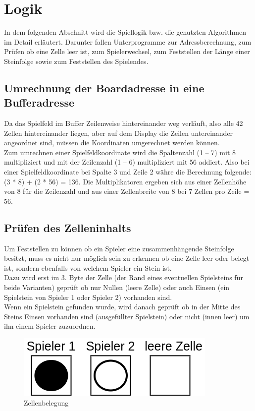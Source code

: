 \newpage
\section{Logik}
    In dem folgenden Abschnitt wird die Spiellogik bzw. die genutzten Algorithmen im Detail erläutert.
    Darunter fallen Unterprogramme zur Adressberechnung, zum Prüfen ob eine Zelle leer ist, zum Spielerwechsel,
    zum Feststellen der Länge einer Steinfolge sowie zum Feststellen des Spielendes.

    \subsection{Umrechnung der Boardadresse in eine Bufferadresse}
        Da das Spielfeld im Buffer Zeilenweise hintereinander weg verläuft, also alle 42 Zellen hintereinander liegen,
        aber auf dem Display die Zeilen untereinander angeordnet sind, müssen die Koordinaten umgerechnet werden können.
        \\
        Zum umrechnen einer Spielfeldkoordinate wird die Spaltenzahl (1 – 7) mit 8 multipliziert und mit der Zeilenzahl (1 – 6) multipliziert mit 56 addiert.
        Also bei einer Spielfeldkoordinate bei Spalte 3 und Zeile 2 währe die Berechnung folgende: (3 * 8) + (2 * 56) = 136.
        Die Multiplikatoren ergeben sich aus einer Zellenhöhe von 8 für die Zeilenzahl und aus einer Zellenbreite von 8 bei 7 Zellen pro Zeile = 56.

    \subsection{Prüfen des Zelleninhalts}
        Um Feststellen zu können ob ein Spieler eine zusammenhängende Steinfolge besitzt,
        muss es nicht nur möglich sein zu erkennen ob eine Zelle leer oder belegt ist,
        sondern ebenfalls von welchem Spieler ein Stein ist.
        \\
        Dazu wird erst im 3. Byte der Zelle (der Rand eines eventuellen Spielsteins für beide Varianten)
        geprüft ob nur Nullen (leere Zelle) oder auch Einsen (ein Spielstein von Spieler 1 oder Spieler 2) vorhanden sind.
        \\
        Wenn ein Spielstein gefunden wurde,
        wird danach geprüft ob in der Mitte des Steins Einsen vorhanden sind (ausgefüllter Spielstein) oder nicht (innen leer)
        um ihn einem Spieler zuzuordnen.

        \begin{figure}[H]
            \centering
            \includegraphics[scale=0.5]{img/steine.png}    
            \caption{Zellenbelegung}
        \end{figure}

